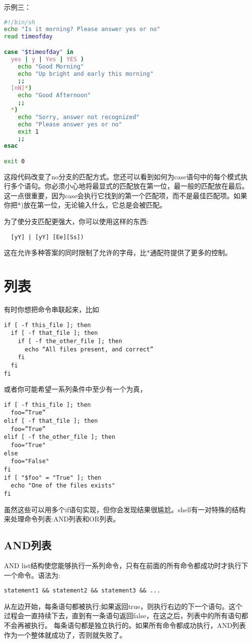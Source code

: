 \documentclass[a4paper]{ctexart}
\begin{document}
示例三：
\begin{lstlisting}[language=sh]
#!/bin/sh
echo "Is it morning? Please answer yes or no"
read timeofday

case "$timeofday" in
  yes | y | Yes | YES )
    echo "Good Morning"
    echo "Up bright and early this morning"
    ;;
  [nN]*)
    echo "Good Afternoon"
    ;;
  *)
    echo "Sorry, answer not recognized"
    echo "Please answer yes or no"
    exit 1
    ;;
esac

exit 0
\end{lstlisting}
这段代码改变了no分支的匹配方式。您还可以看到如何为case语句中的每个模式执行多个语句。你必须小心地将最显式的匹配放在第一位，最一般的匹配放在最后。这一点很重要，因为case会执行它找到的第一个匹配项，而不是最佳匹配项。如果你把*)放在第一位，无论输入什么，它总是会被匹配。

为了使分支匹配更强大，你可以使用这样的东西: 
\begin{lstlisting}
  [yY] | [yY] [Ee][Ss])
\end{lstlisting}
这在允许多种答案的同时限制了允许的字母，比*通配符提供了更多的控制。

\section{列表}
有时你想把命令串联起来，比如
\begin{lstlisting}
if [ -f this_file ]; then
  if [ -f that_file ]; then
    if [ -f the_other_file ]; then
      echo “All files present, and correct”
    fi
  fi
fi
\end{lstlisting}
或者你可能希望一系列条件中至少有一个为真，
\begin{lstlisting}
if [ -f this_file ]; then
  foo=”True”
elif [ -f that_file ]; then
  foo=”True”
elif [ -f the_other_file ]; then
  foo="True"
else
  foo="False"
fi
if [ "$foo" = "True" ]; then
  echo "One of the files exists"
fi  
\end{lstlisting}

虽然这些可以用多个if语句实现，但你会发现结果很尴尬。shell有一对特殊的结构来处理命令列表:AND列表和OR列表。

\subsection{AND列表}
AND list结构使您能够执行一系列命令，只有在前面的所有命令都成功时才执行下一个命令。语法为:
\begin{lstlisting}
statement1 && statement2 && statement3 && ...
\end{lstlisting}
从左边开始，每条语句都被执行;如果返回true，则执行右边的下一个语句。这个过程会一直持续下去，直到有一条语句返回false，在这之后，列表中的所有语句都不会再被执行。
每条语句都是独立执行的。如果所有命令都成功执行，AND列表作为一个整体就成功了，否则就失败了。
\end{document}
